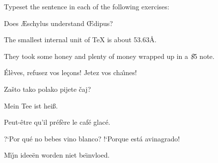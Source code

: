 

Typeset the sentence in each of the following exercises: 

\exercise Does \AE schylus understand \OE dipus? 

\exercise The smallest internal unit of \TeX{} is about 53.63\AA. 

\exercise They took some honey and plenty of money wrapped up in a 
{\it \$}5 note. 

\exercise \'El\`eves, refusez vos le\c cons! Jetez vos cha\^\i nes! 

\exercise Za\v sto tako polako pijete \v caj? 

\exercise Mein Tee ist hei\ss. 

\exercise Peut-\^etre qu'il pr\'ef\`ere le caf\'e glac\'e. 

\exercise ?`Por qu\'e no bebes vino blanco? !`Porque est\'a avinagrado! 

\exercise M\'\i\'\j n idee\"en worden niet be\"\i nvloed. 

